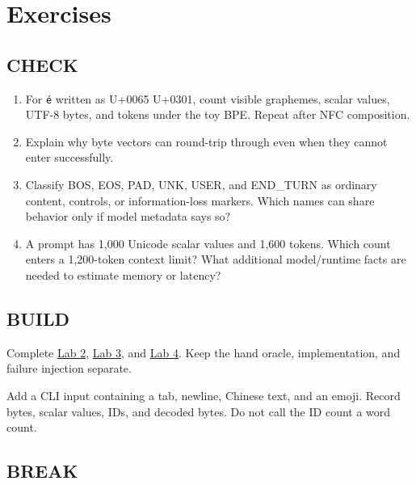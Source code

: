 \section{Exercises}\label{exercises-1}

\subsection{CHECK}\label{check-1}

\begin{enumerate}
\def\labelenumi{\arabic{enumi}.}
\tightlist
\item
  For \texttt{é} written as U+0065 U+0301, count visible graphemes,
  scalar values, UTF-8 bytes, and tokens under the toy BPE. Repeat after
  NFC composition.
\item
  Explain why byte vectors can round-trip through
  \texttt{} even when they cannot enter
  \texttt{} successfully.
\item
  Classify BOS, EOS, PAD, UNK, USER, and END\_TURN as ordinary content,
  controls, or information-loss markers. Which names can share behavior
  only if model metadata says so?
\item
  A prompt has 1,000 Unicode scalar values and 1,600 tokens. Which count
  enters a 1,200-token context limit? What additional model/runtime
  facts are needed to estimate memory or latency?
\end{enumerate}

\subsection{BUILD}\label{build-1}

Complete
\href{https://github.com/hermonai/inside-the-llm-engine/blob/astra-visual-rewrite/labs/lab-02-tokenize-by-hand.md}{Lab
2},
\href{https://github.com/hermonai/inside-the-llm-engine/blob/astra-visual-rewrite/labs/lab-03-stream-utf8-across-tokens.md}{Lab
3}, and
\href{https://github.com/hermonai/inside-the-llm-engine/blob/astra-visual-rewrite/labs/lab-04-use-the-wrong-chat-template.md}{Lab
4}. Keep the hand oracle, implementation, and failure injection
separate.

Add a CLI input containing a tab, newline, Chinese text, and an emoji.
Record bytes, scalar values, IDs, and decoded bytes. Do not call the ID
count a word count.

\subsection{BREAK}\label{break-1}

